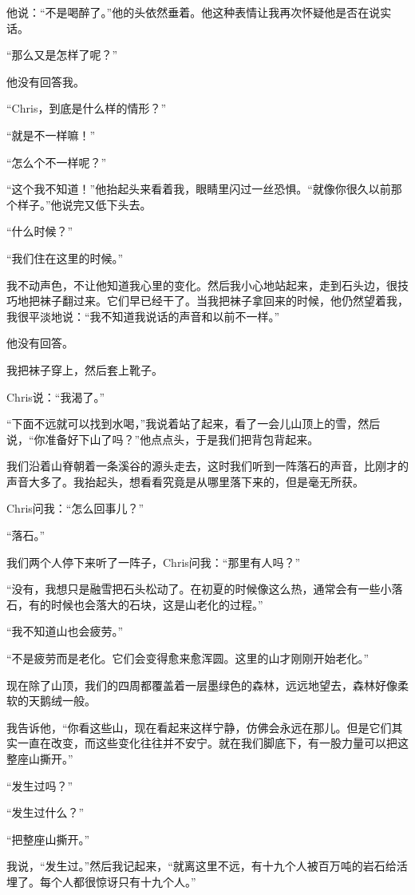 \documentclass[UTF8]{article}
\begin{document}
\par 他说：“不是喝醉了。”他的头依然垂着。他这种表情让我再次怀疑他是否在说实话。
\par “那么又是怎样了呢？”
\par 他没有回答我。
\par “Chris，到底是什么样的情形？”
\par “就是不一样嘛！”
\par “怎么个不一样呢？”
\par “这个我不知道！”他抬起头来看着我，眼睛里闪过一丝恐惧。“就像你很久以前那个样子。”他说完又低下头去。
\par “什么时候？”
\par “我们住在这里的时候。”
\par 我不动声色，不让他知道我心里的变化。然后我小心地站起来，走到石头边，很技巧地把袜子翻过来。它们早已经干了。当我把袜子拿回来的时候，他仍然望着我，我很平淡地说：“我不知道我说话的声音和以前不一样。”
\par 他没有回答。
\par 我把袜子穿上，然后套上靴子。
\par Chris说：“我渴了。”
\par “下面不远就可以找到水喝，”我说着站了起来，看了一会儿山顶上的雪，然后说，“你准备好下山了吗？”他点点头，于是我们把背包背起来。
\par 我们沿着山脊朝着一条溪谷的源头走去，这时我们听到一阵落石的声音，比刚才的声音大多了。我抬起头，想看看究竟是从哪里落下来的，但是毫无所获。
\par Chris问我：“怎么回事儿？”
\par “落石。”
\par 我们两个人停下来听了一阵子，Chris问我：“那里有人吗？”
\par “没有，我想只是融雪把石头松动了。在初夏的时候像这么热，通常会有一些小落石，有的时候也会落大的石块，这是山老化的过程。”
\par “我不知道山也会疲劳。”
\par “不是疲劳而是老化。它们会变得愈来愈浑圆。这里的山才刚刚开始老化。”
\par 现在除了山顶，我们的四周都覆盖着一层墨绿色的森林，远远地望去，森林好像柔软的天鹅绒一般。
\par 我告诉他，“你看这些山，现在看起来这样宁静，仿佛会永远在那儿。但是它们其实一直在改变，而这些变化往往并不安宁。就在我们脚底下，有一股力量可以把这整座山撕开。”
\par “发生过吗？”
\par “发生过什么？”
\par “把整座山撕开。”
\par 我说，“发生过。”然后我记起来，“就离这里不远，有十九个人被百万吨的岩石给活埋了。每个人都很惊讶只有十九个人。”
\end{document}
